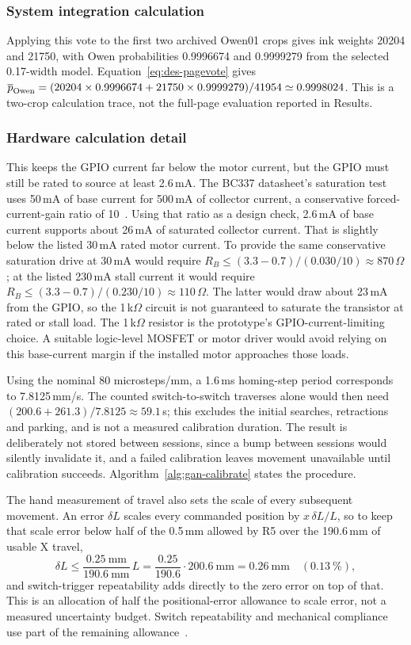 \subsubsection{System integration calculation}
Applying this vote to the first two archived Owen01 crops gives ink weights 20204 and 21750, with Owen probabilities 0.9996674 and 0.9999279 from the selected 0.17-width model. Equation~\ref{eq:des-pagevote} gives $\overline p_{\rm Owen}=(20204\times0.9996674+21750\times0.9999279)/41954\simeq0.9998024$. This is a two-crop calculation trace, not the full-page evaluation reported in Results.


\subsubsection{Hardware calculation detail}
This keeps the GPIO current far below the motor current, but the GPIO must still be rated to source at least 2.6\,mA. The BC337 datasheet's saturation test uses 50\,mA of base current for 500\,mA of collector current, a conservative forced-current-gain ratio of 10~\cite{bc337ds}. Using that ratio as a design check, 2.6\,mA of base current supports about 26\,mA of saturated collector current. That is slightly below the listed 30\,mA rated motor current. To provide the same conservative saturation drive at 30\,mA would require $R_B\le(3.3-0.7)/(0.030/10)\approx870\,\Omega$; at the listed 230\,mA stall current it would require $R_B\le(3.3-0.7)/(0.230/10)\approx110\,\Omega$. The latter would draw about 23\,mA from the GPIO, so the 1\,k$\Omega$ circuit is not guaranteed to saturate the transistor at rated or stall load. The 1\,k$\Omega$ resistor is the prototype's GPIO-current-limiting choice. A suitable logic-level MOSFET or motor driver would avoid relying on this base-current margin if the installed motor approaches those loads.

Using the nominal 80 microsteps/mm, a 1.6\,ms homing-step period corresponds to 7.8125\,mm/s. The counted switch-to-switch traverses alone would then need $(200.6+261.3)/7.8125\approx59.1$\,s; this excludes the initial searches, retractions and parking, and is not a measured calibration duration. The result is deliberately not stored between sessions, since a bump between sessions would silently invalidate it, and a failed calibration leaves movement unavailable until calibration succeeds. Algorithm~\ref{alg:gan-calibrate} states the procedure.

The hand measurement of travel also sets the scale of every subsequent movement. An error $\delta L$ scales every commanded position by $x\,\delta L/L$, so to keep that scale error below half of the 0.5\,mm allowed by R5 over the 190.6\,mm of usable X travel,
\begin{equation}
\delta L\le\frac{0.25\ \mathrm{mm}}{190.6\ \mathrm{mm}}\,L=\frac{0.25}{190.6}\cdot200.6\ \mathrm{mm}=0.26\ \mathrm{mm}\quad(0.13\ \%),
\label{eq:gan-budget}
\end{equation}
and switch-trigger repeatability adds directly to the zero error on top of that. This is an allocation of half the positional-error allowance to scale error, not a measured uncertainty budget. Switch repeatability and mechanical compliance use part of the remaining allowance~\cite[pp.~18--19]{jcgm2008}.


